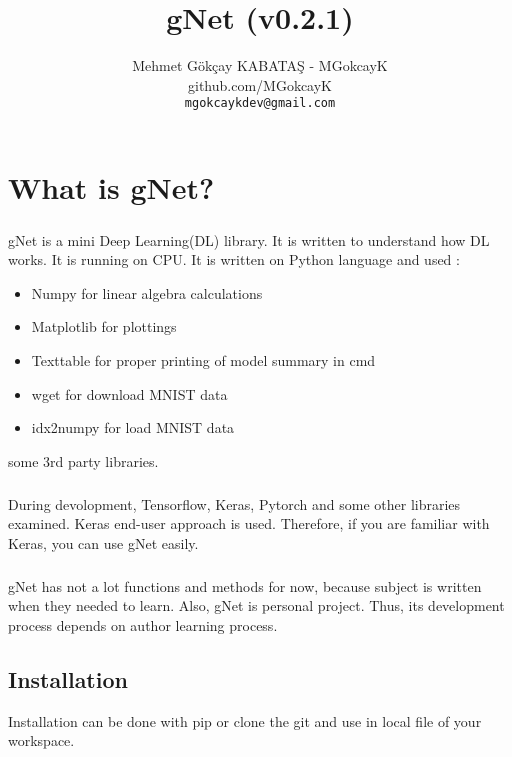 \documentclass[12pt]{report}
\title {gNet (v0.2.1)}
\author{Mehmet Gökçay KABATAŞ - MGokcayK \\ github.com/MGokcayK \\ \texttt{mgokcaykdev@gmail.com}
}
\begin{document}
\maketitle
\tableofcontents





\chapter{What is gNet?}

\paragraph{}
gNet is a mini Deep Learning(DL) library. It is written to understand how DL works. It is running on CPU. It is written on Python language and used :

\begin{itemize}
	\item Numpy for linear algebra calculations
	\item Matplotlib for plottings
	\item Texttable for proper printing of model summary in cmd
	\item wget for download MNIST data
	\item idx2numpy for load MNIST data
\end{itemize}

some 3rd party libraries.

\paragraph{}
During devolopment, Tensorflow, Keras, Pytorch and some other libraries examined. Keras end-user approach is used. Therefore, if you are familiar with Keras, you can use gNet easily. 

\paragraph{}
gNet has not a lot functions and methods for now, because subject is written when they needed to learn. Also, gNet is personal project. Thus, its development process depends on author learning process.

\section{Installation}
Installation can be done with pip or clone the git and use in local file of your workspace.
\end{document}

